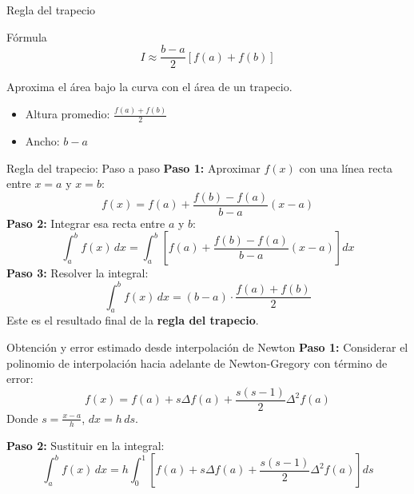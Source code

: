 \documentclass[main.tex]{subfiles}
\begin{document}
\begin{frame}{Regla del trapecio}
  \begin{block}{Fórmula}
    \[ I \approx \frac{b - a}{2} [f(a) + f(b)] \]
  \end{block}
  Aproxima el área bajo la curva con el área de un trapecio.
  \begin{itemize}
    \item Altura promedio: \( \frac{f(a) + f(b)}{2} \)
    \item Ancho: \( b - a \)
  \end{itemize}
\end{frame}
\begin{frame}{Regla del trapecio: Paso a paso}
\textbf{Paso 1:} Aproximar \( f(x) \) con una línea recta entre \( x = a \) y \( x = b \):
\[ f(x) = f(a) + \frac{f(b) - f(a)}{b - a}(x - a) \]
\textbf{Paso 2:} Integrar esa recta entre \( a \) y \( b \):
\[ \int_a^b f(x) \, dx = \int_a^b \left[ f(a) + \frac{f(b) - f(a)}{b - a}(x - a) \right] dx \]
\textbf{Paso 3:} Resolver la integral:
\[ \int_a^b f(x) \, dx = (b - a) \cdot \frac{f(a) + f(b)}{2} \]
Este es el resultado final de la \textbf{regla del trapecio}.
\end{frame}
\begin{frame}{Obtención y error estimado desde interpolación de Newton}
\textbf{Paso 1:} Considerar el polinomio de interpolación hacia adelante de Newton-Gregory con término de error:
\[ f(x) = f(a) + s\Delta f(a) + \frac{s(s-1)}{2} \Delta^2 f(a) \]
Donde \( s = \frac{x - a}{h} \), \( dx = h\,ds \).

\textbf{Paso 2:} Sustituir en la integral:
\[ \int_a^b f(x)\,dx = h \int_0^1 \left[f(a) + s\Delta f(a) + \frac{s(s - 1)}{2} \Delta^2 f(a)\right] ds \]
\end{frame}
\end{document}
